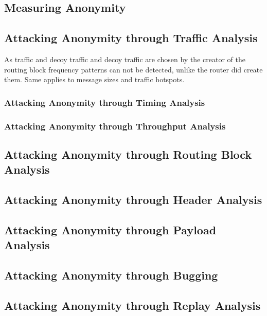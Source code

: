 \subsection{Measuring Anonymity}

\subsection{Attacking Anonymity through Traffic Analysis}
As traffic and decoy traffic and decoy traffic are chosen by the creator of the routing block frequency patterns can not be detected, unlike the router did create them. Same applies to message sizes and traffic hotspots. 

\subsubsection{Attacking Anonymity through Timing Analysis}

\subsubsection{Attacking Anonymity through Throughput Analysis}

\subsection{Attacking Anonymity through Routing Block Analysis}

\subsection{Attacking Anonymity through Header Analysis}

\subsection{Attacking Anonymity through Payload Analysis}

\subsection{Attacking Anonymity through Bugging}

\subsection{Attacking Anonymity through Replay Analysis}

